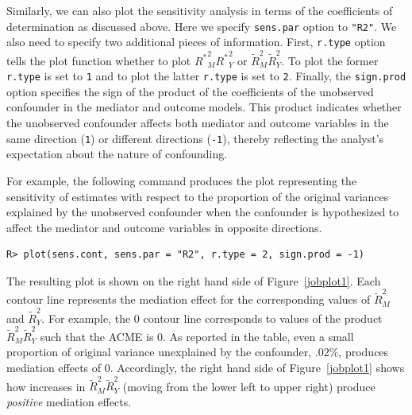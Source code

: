 \documentclass[11pt,letterpaper]{article}
\theoremstyle{plain}
\begin{document}

Similarly, we can also plot the sensitivity analysis in terms of the
coefficients of determination as discussed above. Here we specify \texttt{sens.par}
option to \texttt{"R2"}.  We also need to specify two additional pieces of information.
First, \texttt{r.type} option tells the plot function whether to plot
${R^\ast}^2_M{R^\ast}^2_Y$ or $\widetilde{R}^2_M\widetilde{R}^2_Y$. To plot the
former \texttt{r.type} is set to \texttt{1} and to plot the latter \texttt{r.type} is set
to \texttt{2}.  Finally, the \texttt{sign.prod} option specifies the sign of the
product of the coefficients of the unobserved confounder in the mediator and outcome models.
This product indicates whether the unobserved confounder affects both mediator and outcome
variables in the same direction (\texttt{1}) or different directions (\texttt{-1}), thereby
reflecting the analyst's expectation about the nature of confounding.

For example, the following command produces the plot representing the sensitivity
of estimates with respect to the proportion of the original variances explained by
the unobserved confounder when the confounder is hypothesized to affect the mediator
and outcome variables in opposite directions.
\begin{verbatim}
R> plot(sens.cont, sens.par = "R2", r.type = 2, sign.prod = -1)
\end{verbatim}
The resulting plot is shown on the right hand side of Figure~\ref{jobplot1}. Each contour
line represents the mediation effect for the corresponding values of
$\widetilde{R}^2_M$ and $\widetilde{R}^2_Y$. For example, the 0 contour line
corresponds to values of the product $\widetilde{R}^2_M\widetilde{R}^2_Y$ such
that the ACME is 0. As reported in the table, even a small proportion of
original variance unexplained by the confounder, $.02\%$, produces mediation
effects of 0.  Accordingly, the right hand side of Figure~\ref{jobplot1} shows
how increases in $\widetilde{R}^2_M\widetilde{R}^2_Y$ (moving from the lower
left to upper right) produce \emph{positive} mediation effects.
\end{document}
